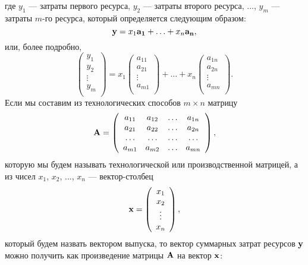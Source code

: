     где $y_{1}$ --- затраты первого ресурса, $y_{2}$ ---
    затраты второго ресурса, ...,  $y_{m}$ --- затраты $m$-го
    ресурса, который определяется следующим образом:
    \[\mathbf{y}=x_{1}\mathbf{a_{1}}+\ldots+x_{n}\mathbf{a_{n}},\]
    или, более подробно,
    \[\left(
     \begin{array}{c}
        y_{1} \\
        y_{2} \\
        \vdots \\
        y_{m}  \\
      \end{array}
    \right)=
    x_{1}\left(
     \begin{array}{c}
        a_{11} \\
        a_{21} \\
        \vdots \\
        a_{m1}  \\
      \end{array}
    \right)+\ldots+
    x_{n}\left(
     \begin{array}{c}
        a_{1n} \\
        a_{2n} \\
        \vdots \\
        a_{mn}  \\
      \end{array}
    \right).\]
    Если мы составим из технологических способов $m \times n$ матрицу
    \[\mathbf{A}=\left(
\begin{array}{cccc}
   a_{11} & a_{12} & \ldots & a_{1n} \\
   a_{21} & a_{22} & \ldots & a_{2n} \\
   \ldots& \ldots &\ldots &\ldots \\
   a_{m1} & a_{m2} & \ldots & a_{mn}
\end{array}
\right),\]
    которую мы будем называть технологической или производственной
    матрицей, а из чисел
    $x_{1}$, $x_{2}$, ..., $x_{n}$ --- вектор-столбец
    \[\mathbf{x}=\left(
     \begin{array}{c}
        x_{1} \\
        x_{2} \\
        \vdots \\
        x_{n}  \\
      \end{array}
    \right),\]
    который будем назвать вектором выпуска, то вектор суммарных
    затрат ресурсов $\mathbf{y}$ можно получить как
    произведение матрицы $\mathbf{A}$ на вектор $\mathbf{x}$:
